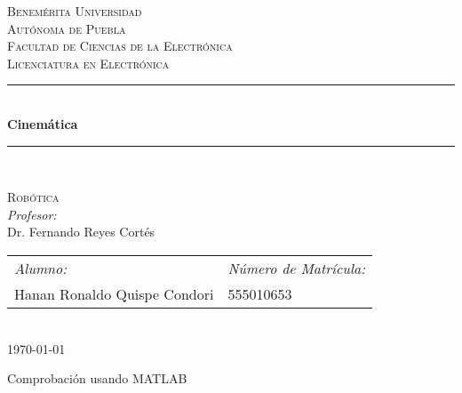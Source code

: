 \documentclass[12pt]{article}
\date{\today}
\begin{document}
\begin{titlepage}
\newcommand{\HRule}{\rule{\linewidth}{0.5mm}} 
\center
\textsc{\LARGE  Benemérita Universidad \\[0.2cm] Autónoma de Puebla}\\[1.5cm] 
\textsc{\Large Facultad de Ciencias de la Electrónica}\\[0.5cm] 
\textsc{\large Licenciatura en Electrónica}\\[0.5cm]
\HRule \\[0.4cm]
{ \huge \bfseries Cinemática}\\[0.4cm] 
\HRule \\[1.5cm]
\begin{minipage}{\textwidth}
\center 
\textsc{\LARGE Robótica}\\[1.7cm] 
\emph{Profesor:} \\
Dr. Fernando Reyes Cortés \\[1cm]
\begin{tabular}{ll}
\emph{Alumno:} & \emph{Número de Matrícula:}\\
Hanan Ronaldo Quispe Condori  & 555010653\\
\end{tabular}
\end{minipage}\\[2cm]
\today
\end{titlepage}

\newpage
Comprobación usando MATLAB


\end{document}
